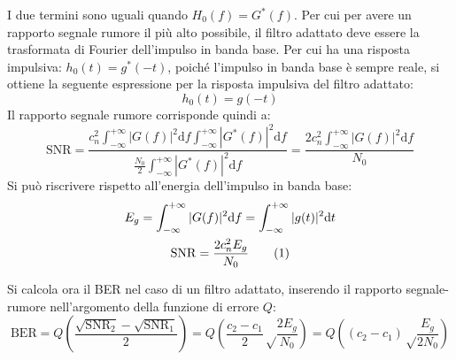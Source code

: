 \documentclass{article}
\newcommand{\df}{\mathrm{d}}
\newcommand{\intinf}{\displaystyle\int_{-\infty}^{+\infty}}
\newcommand{\tageq}{\tag{\stepcounter{equation}\theequation}}
\numberwithin{equation}{subsection}
\begin{document}
I due termini sono uguali quando $H_0(f)=G^*(f)$. Per cui per avere un rapporto segnale rumore il più alto possibile, il filtro adattato deve essere la trasformata di 
Fourier dell'impulso in banda base. Per cui ha una risposta impulsiva: $h_0(t)=g^*(-t)$, poiché l'impulso in banda base è sempre reale, si ottiene la seguente espressione 
per la risposta impulsiva del filtro adattato:
\begin{equation}
    h_0(t)=g(-t)
\end{equation}
Il rapporto segnale rumore corrisponde quindi a:
\begin{equation*}
    \mathrm{SNR}=\displaystyle\frac{c_n^2\intinf |G(f)|^2\df f\intinf |G^*(f)|^2\df f}{\displaystyle\frac{N_0}{2}\intinf |G^*(f)|^2\df f}=\frac{2c_n^2\intinf |G(f)|^2\df f}{N_0}
\end{equation*}
Si può riscrivere rispetto all'energia dell'impulso in banda base:
\begin{gather*}
    E_g=\intinf |G(f)|^2\df f=\intinf |g(t)|^2\df t\\
    \mathrm{SNR}=\displaystyle\frac{2c_n^2E_g}{N_0}\tageq
\end{gather*}

Si calcola ora il BER nel caso di un filtro adattato, inserendo il rapporto segnale-rumore nell'argomento della funzione di errore $Q$:
\begin{equation}
    \mathrm{BER}=Q\left(\displaystyle\frac{\sqrt{\mathrm{SNR}_2}-\sqrt{\mathrm{SNR}_1}}{2}\right)=Q\left(\frac{c_2-c_1}{2}\sqrt\frac{2E_g}{N_0}\right)=Q\left((c_2-c_1)\sqrt\frac{E_g}{2N_0}\right)
\end{equation}
\end{document}
